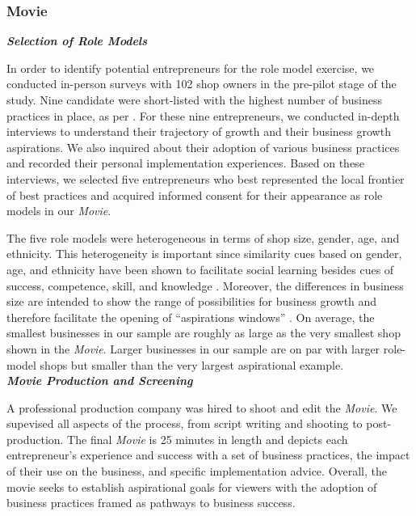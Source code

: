 \documentclass[11.5pt]{article}
\begin{document}
\subsubsection{Movie}

\emph{\textbf{Selection of Role Models}}\

\noindent In order to identify potential entrepreneurs for the role model exercise, we conducted in-person surveys with 102 shop owners in the pre-pilot stage of the study. Nine candidate were short-listed with the highest number of business practices in place, as per \citet{McKenzie2017}. For these nine entrepreneurs, we conducted in-depth interviews to understand their trajectory of growth and their business growth aspirations. We also inquired about their adoption of various business practices and recorded their  personal implementation experiences. Based on these interviews, we selected five entrepreneurs who best represented the local frontier of best practices and acquired informed consent for their appearance as role models in our \emph{Movie}.

The five role models were heterogeneous in terms of shop size, gender, age, and ethnicity. This heterogeneity is important since similarity cues based on gender, age, and ethnicity have been shown to facilitate social learning besides cues of success, competence, skill, and knowledge \citep[see, e.g.,][]{Rendell2011, Efferson2008, Chudek2013, Henrich2001, Corriveau2009, McElreath2008}. Moreover, the differences in business size are intended to show the range of possibilities for business growth and therefore facilitate the opening of ``aspirations windows'' \citep{Ray2006}. On average, the smallest businesses in our sample are roughly as large as the very smallest shop shown in the \emph{Movie}. Larger businesses in our sample are on par with larger role-model shops but smaller than the very largest aspirational example.\\

\noindent \emph{\textbf{Movie Production and Screening}}\

\noindent A professional production company was hired to shoot and edit the \emph{Movie}. We supevised all aspects of the process, from script writing and shooting to post-production. The final \emph{Movie} is 25 minutes in length and depicts each entrepreneur's experience and success with a set of business practices, the impact of their use on the business, and specific implementation advice. Overall, the movie seeks to establish aspirational goals for viewers with the adoption of business practices framed as pathways to business success. 
\end{document}
